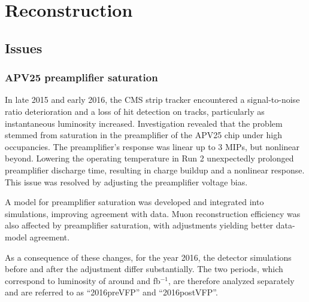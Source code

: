 \chapter{Reconstruction}

\section{Issues}
\subsection{APV25 preamplifier saturation}
In late 2015 and early 2016, the CMS strip tracker encountered a signal-to-noise ratio deterioration and a loss of hit detection on tracks, particularly as instantaneous luminosity increased.
Investigation revealed that the problem stemmed from saturation in the preamplifier of the APV25 chip under high occupancies.
The preamplifier's response was linear up to 3 MIPs, but nonlinear beyond.
Lowering the operating temperature in Run 2 unexpectedly prolonged preamplifier discharge time, resulting in charge buildup and a nonlinear response.
This issue was resolved by adjusting the preamplifier voltage bias.

A model for preamplifier saturation was developed and integrated into simulations, improving agreement with data.
Muon reconstruction efficiency was also affected by preamplifier saturation, with adjustments yielding better data-model agreement.


As a consequence of these changes, for the year 2016, the detector simulations before and after the adjustment differ substantially.
The two periods, which correspond to luminosity of around  and  fb${}^{-1}$,
are therefore analyzed separately and are referred to as ``2016preVFP'' and ``2016postVFP''.
